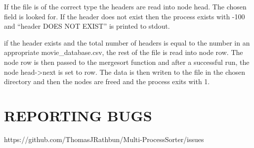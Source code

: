 \documentclass{article}
\begin{document}
\begin{center}
If the file is of the correct type the headers are read into node head. The chosen field is looked for. If the header does not exist then the process exists with -100 and ``header DOES NOT EXIST'' is printed to stdout.

if the header exists and the total number of headers is equal to the number in an appropriate movie_database.csv, the rest of the file is read into node row. The node row is then passed to the mergesort function and after a successful run, the node head->next is set to row. The data is then writen to the file in the chosen directory and then the nodes are freed and the process exits with 1.



\end{center}
\section{REPORTING BUGS}
\begin{center}
https://github.com/ThomasJRathbun/Multi-ProcessSorter/issues
\end{center}
\end{document}
